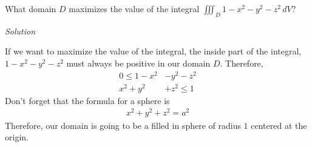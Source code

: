 \documentclass{article}
\newcommand{\Solution}{\textit{Solution}}
\begin{document}
What domain $D$ maximizes the value of the integral $\displaystyle \iiint_D 1-x^2-y^2-z^2\,dV$?

\Solution

If we want to maximize the value of the integral, the inside part of the integral, $1-x^2-y^2-z^2$ must always be positive in our domain $D$. Therefore,
\begin{align*}
    0\leq 1-x^2&-y^2-z^2\\
   x^2 + y^2& + z^2 \leq 1
\end{align*}
Don't forget that the formula for a sphere is \begin{align*}
    x^2+y^2+z^2=a^2
\end{align*}
Therefore, our domain is going to be a filled in sphere of radius $1$ centered at the origin.
\end{document}
